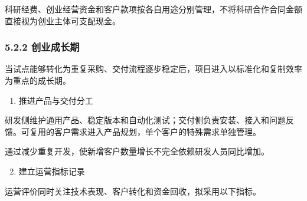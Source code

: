 科研经费、创业经营资金和客户款项按各自用途分别管理，不将科研合作合同金额直接视为创业主体可支配现金。

\subsubsection{5.2.2 创业成长期}\label{ux521bux4e1aux6210ux957fux671f}

当试点能够转化为重复采购、交付流程逐步稳定后，项目进入以标准化和复制效率为重点的成长期。

\begin{enumerate}

\item
  推进产品与交付分工
\end{enumerate}

研发侧维护通用产品、稳定版本和自动化测试；交付侧负责安装、接入和问题反馈。可复用的客户需求进入产品规划，单个客户的特殊需求单独管理。

通过减少重复开发，使新增客户数量增长不完全依赖研发人员同比增加。

\begin{enumerate}

\setcounter{enumi}{1}
\item
  建立运营指标记录
\end{enumerate}

运营评价同时关注技术表现、客户转化和资金回收，拟采用以下指标。

